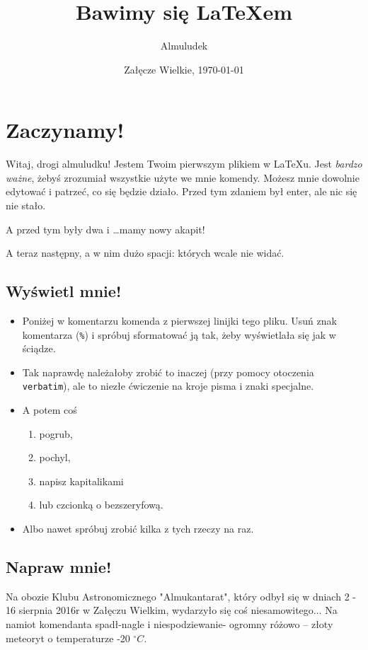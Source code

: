 \documentclass[12pt,a4paper]{article}
\author{Almuludek}
\title{Bawimy się \LaTeX em}
\date{Załęcze Wielkie, \today}
\begin{document}
\maketitle

\section{Zaczynamy!}
Witaj, drogi almuludku! Jestem Twoim pierwszym plikiem w \LaTeX u. %
Jest \emph{bardzo ważne}, żebyś zrozumiał wszystkie użyte we mnie komendy. Możesz mnie dowolnie edytować i patrzeć, co się będzie działo. 
Przed tym zdaniem był enter, ale nic się nie stało. 

A przed tym były dwa i \ldots mamy nowy akapit! \par A teraz następny, a w nim dużo spacji:                        których wcale nie widać.

\subsection{Wyświetl mnie!}

\begin{itemize}
\item Poniżej w komentarzu komenda z pierwszej linijki tego pliku. Usuń znak komentarza (\texttt{\%}) i spróbuj sformatować ją tak, żeby wyświetlała się jak w ściądze. 
\item Tak naprawdę należałoby zrobić to inaczej (przy pomocy otoczenia \texttt{verbatim}), ale to niezłe ćwiczenie na kroje pisma i znaki specjalne.

\item A potem coś 
\begin{enumerate}
\item pogrub, \item pochyl, \item napisz kapitalikami \item lub czcionką o bezszeryfową.
\end{enumerate}

\item Albo nawet spróbuj zrobić kilka z tych rzeczy na raz.
\end{itemize}

\subsection{Napraw mnie!}

Na obozie Klubu Astronomicznego "Almukantarat", który odbył się w dniach 2 - 16 sierpnia 2016r w Załęczu Wielkim, wydarzyło się coś niesamowitego... Na namiot komendanta spadł-nagle i niespodziewanie- ogromny różowo -- złoty meteoryt o temperaturze -20 $^\circ C$.
\end{document}
